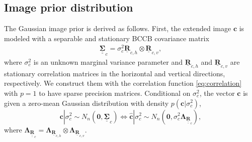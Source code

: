 \documentclass[12pt]{article}
\newcommand{\mycirc}[1] {\underline{\bm{#1}}}
\newcommand{\mybcirc}[1] {\underline{\underline{\bm{#1}}}}
\begin{document}
\subsection{Image prior distribution}\label{sec:image_model}
The Gaussian image prior is derived as follows. 
First, the extended image $\bm{c}$ is modeled with a
separable and stationary BCCB covariance matrix
\begin{align} \label{eq:covariance_c}
\mybcirc{\Sigma}_c=\sigma_c^2 
\mycirc{R}_{c,h}\otimes \mycirc{R}_{c,v},
\end{align}
where $\sigma_c^2$ is an unknown marginal variance parameter and $\mycirc{R}_{c,h}$ and $\mycirc{R}_{c,v}$
are stationary correlation matrices in the horizontal and vertical directions, respectively. We construct them with the correlation function \eqref{eq:correlation} with $p=1$ to have sparse precision matrices. Conditional on $\sigma_c^2$, the vector $\bm{c}$ is given a zero-mean Gaussian distribution with density $p(\bm{c}|\sigma_c^2)$,
\begin{equation} \label{eq:image_prior}
    \bm{c}|\sigma_c^2 \sim N_n(\bm{0}, \mybcirc{\Sigma}_c) 
    \iff
    \hat{\bm{c}}|\sigma_c^2 \sim N_n(\bm{0}, \sigma_c^2 \bm{\Lambda}_{\mybcirc{R}_{c}}),
\end{equation}
where $\bm{\Lambda}_{\mybcirc{R}_{c}} = \bm{\Lambda}_{\mycirc{R}_{c,h}}  \otimes \bm{\Lambda}_{\mycirc{R}_{c,v}}$.
\end{document}
